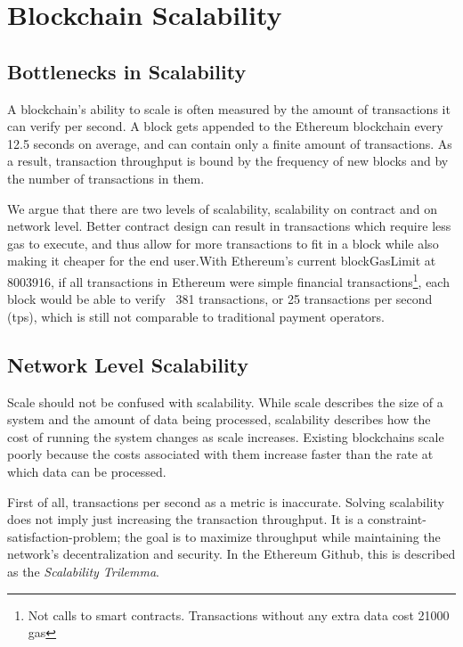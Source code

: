 \chapter{Blockchain Scalability}\label{ch:scalability}

\section{Bottlenecks in Scalability}
A blockchain's ability to scale is often measured by the amount of transactions it can verify per second. A block gets appended to the Ethereum blockchain every 12.5 seconds on average, and can contain only a finite amount of transactions. As a result, transaction throughput is bound by the frequency of new blocks and by the number of transactions in them.

We argue that there are two levels of scalability, scalability on contract and on network level. Better contract design can result in transactions which require less gas to execute, and thus allow for more transactions to fit in a block while also making it cheaper for the end user.With Ethereum's current blockGasLimit at 8003916, if all transactions in Ethereum were simple financial transactions\footnote{Not calls to smart contracts. Transactions without any extra data cost 21000 gas}, each block would be able to verify ~381 transactions, or 25 transactions per second (tps), which is still not comparable to traditional payment operators. 

\section{Network Level Scalability}
Scale should not be confused with scalability. While scale describes the size of a system and the amount of data being processed, scalability describes how the cost of running the system changes as scale increases. Existing blockchains scale poorly because the costs associated with them increase faster than the rate at which data can be processed. 

First of all, transactions per second as a metric is inaccurate. Solving scalability does not imply just increasing the transaction throughput. It is a constraint-satisfaction-problem; the goal is to maximize throughput while maintaining the network's decentralization and security. In the Ethereum Github, this is described as the \textit{Scalability Trilemma}.

